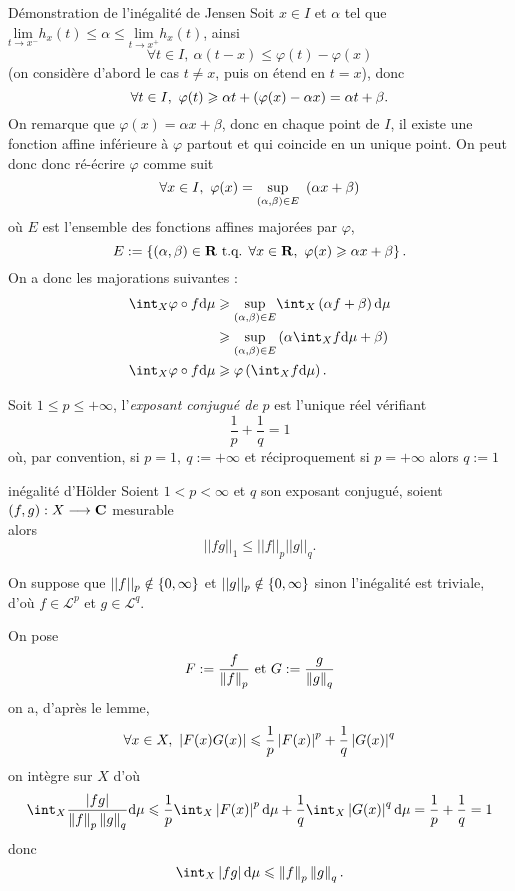 \documentclass[a4paper,11pt, twoside]{article}
\begin{document}
\begin{ProofC}{Démonstration de l'inégalité de Jensen}
  Soit $x\in I$ et $\alpha$ tel que $\underset{t\to x^-}{\mathrm{lim}}h_x(t)\leqslant \alpha\leqslant \underset{t\to x^+}{\mathrm{lim}}h_x(t)$, ainsi 
  $$\forall t\in I,\ \alpha(t-x)\leqslant \varphi(t)-\varphi(x)$$
  (on considère d'abord le cas $t\neq x$, puis on étend en $t=x$), donc 
  $$\forall t\in I,\ \varphi(t)\geqslant \alpha t +\left(\varphi(x)-\alpha x\right)=\alpha t +\beta.$$
  On remarque que $\varphi(x)=\alpha x+\beta$, donc en chaque point de $I$, il existe une fonction affine inférieure à $\varphi$ partout et qui coincide en un unique point. On peut donc donc ré-écrire $\varphi$ comme suit
  $$\forall x\in I,\ \varphi(x)=\underset{(\alpha,\beta)\in E}{\mathrm{sup}}\ \Par{\alpha x+\beta}$$
  où $E$ est l'ensemble des fonctions affines majorées par $\varphi$, 
  $$E:=\left\{(\alpha,\beta)\in \mathbf R\text{ t.q. } \forall x\in\mathbf R,\ \varphi(x)\geqslant \alpha x+\beta\right\}.$$
  On a donc les majorations suivantes :
  \begin{align*}
    \int_X\varphi\circ f\mathrm d\mu&\geqslant \underset{(\alpha,\beta)\in E}{\mathrm{sup}}\int_X \Par{\alpha f+\beta}\mathrm d\mu\\
    &\geqslant \underset{(\alpha,\beta)\in E}{\mathrm{sup}} \Par{\alpha\int_X f\mathrm d\mu+\beta}\\
     \int_X\varphi\circ f\mathrm d\mu&\geqslant \varphi\Par{\int_Xf\mathrm d\mu}.
  \end{align*}
\end{ProofC}


\begin{Def}
  Soit $1\leqslant p\leqslant+\infty$, l'\emph{exposant conjugué de }$p$ est l'unique réel vérifiant
  $$\frac1p+\frac1q=1$$
  où, par convention, si $p=1,\ q:=+\infty$ et réciproquement si $p=+\infty$ alors $q:=1$
\end{Def}


\begin{propC}{inégalité d'Hölder}
  Soient $1< p< \infty$ et $q$ son exposant conjugué, soient $(f,g):X\longrightarrow\mathbf C$ mesurable\\

  alors
  $$||fg||_1\leqslant||f||_p||g||_q.$$
\end{propC}
  
\begin{Proof}
  On suppose que $||f||_p\notin \left\{0,\infty\right\}$ et $||g||_p\notin \left\{0,\infty\right\}$ sinon l'inégalité est triviale, d'où $f\in\mathcal L^p$ et $g\in\mathcal L^q$.

  On pose 
  $$F:=\frac{f}{\left\lVert f\right\rVert_p}\text{ et }G:=\frac{g}{\left\lVert g\right\rVert_q}$$
  on a, d'après le lemme,
  $$\forall x\in X,\ \left| F(x)G(x)\right|\leqslant \frac{1}{p}\left| F(x)\right|^p+\frac{1}{q}\left| G(x)\right|^q$$
  on intègre sur $X$ d'où
  $$\int_X\frac{\abs{fg}}{\norm{f}_p\norm{g}_q}\mathrm d\mu\leqslant \frac{1}{p}\int_X\abs{F(x)}^p\mathrm d\mu+\frac{1}{q}\int_X\abs{G(x)}^q\mathrm d\mu=\frac1p+\frac1q=1$$
  donc
  $$\int_X\abs{fg}\mathrm d\mu\leqslant \norm{f}_p\norm{g}_q.$$
\end{Proof}
\end{document}
